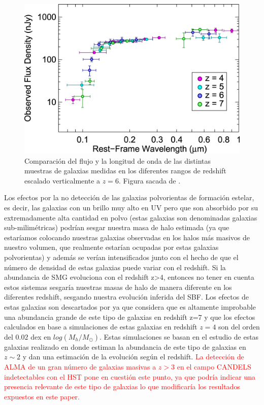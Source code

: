 \documentclass{article}
\begin{document}
\begin{figure}[t]
\begin{center}
\includegraphics[scale=1]{Figuras/sed_finkelstein}
\caption{\label{fig:sed_finkelstein} Comparación del flujo y la longitud de onda de las distintas muestras de galaxias medidas en los diferentes rangos de redshift escalado verticalmente a $z=6$. Figura sacada de \cite{finkelstein2015increasing}.}
\end{center}
\end{figure}

Los efectos por la no detección de las galaxias polvorientas de formación estelar, es decir, las galaxias con un brillo muy alto en UV pero que son absorbido por su extremadamente alta cantidad en polvo (estas galaxias son denominadas galaxias sub-milimétricas) podrían sesgar nuestra masa de halo estimada (ya que estaríamos colocando nuestras galaxias observadas en los halos más masivos de nuestro volumen, que realmente estarían ocupadas por estas galaxias polvorientas) y además se verían intensificados junto con el hecho de que el número de densidad de estas galaxias puede variar con el redshift. Si la abundancia de SMG evoluciona con el redshift z>4, entonces no tener en cuenta estos sistemas sesgaría nuestras masas de halo de manera diferente en los diferentes redshift, sesgando nuestra evolución inferida del SBF. Los efectos de estas galaxias son descartados por \cite{finkelstein2015increasing}ya que considera que es altamente improbable una abundancia grande de este tipo de galaxias en redshift z=7 y que los efectos calculados en base a simulaciones de estas galaxias en redshift $z=4$ son del orden del $0.02$ dex en $log(M_h/M_\odot)$. Estas simulaciones se basan en el estudio de estas galaxias realizado en \cite{casey2014dusty} donde estiman la abundancia de este tipo de galaxias en $z\sim 2$ y dan una estimación de la evolución según el redshift. \textcolor{red}{La detección de ALMA de un gran número de galaxias masivas a $z>3$ en el campo CANDELS \citep{wang2019dominant} indetectables con el HST pone en cuestión este punto, ya que podría indicar una presencia relevante de este tipo de galaxias lo que modificaría los resultados expuestos en este paper.}\\
\end{document}

